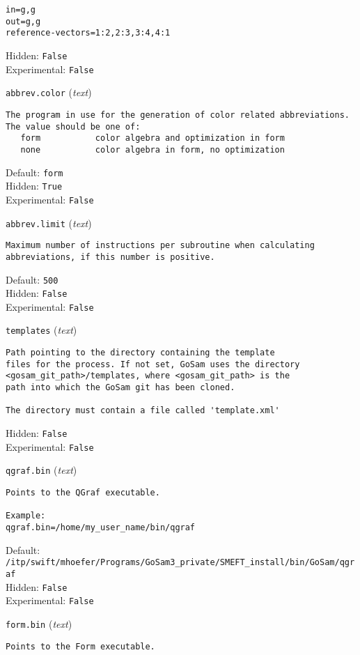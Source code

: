\begin{basedescript}{\desclabelstyle{\pushlabel}}
\begin{verbatim}
in=g,g
out=g,g
reference-vectors=1:2,2:3,3:4,4:1
\end{verbatim}
Hidden: \verb|False|
\\Experimental: \verb|False|
\\\item[\colorbox{gray!30}{\texttt{abbrev.color}}] (\textit{text})
\begin{verbatim}
The program in use for the generation of color related abbreviations.
The value should be one of:
   form           color algebra and optimization in form
   none           color algebra in form, no optimization
\end{verbatim}
Default: \verb|form|
\\Hidden: \verb|True|
\\Experimental: \verb|False|
\\\item[\colorbox{gray!30}{\texttt{abbrev.limit}}] (\textit{text})
\begin{verbatim}
Maximum number of instructions per subroutine when calculating
abbreviations, if this number is positive.
\end{verbatim}
Default: \verb|500|
\\Hidden: \verb|False|
\\Experimental: \verb|False|
\\\item[\colorbox{gray!30}{\texttt{templates}}] (\textit{text})
\begin{verbatim}
Path pointing to the directory containing the template
files for the process. If not set, GoSam uses the directory
<gosam_git_path>/templates, where <gosam_git_path> is the
path into which the GoSam git has been cloned.

The directory must contain a file called 'template.xml'
\end{verbatim}
Hidden: \verb|False|
\\Experimental: \verb|False|
\\\item[\colorbox{gray!30}{\texttt{qgraf.bin}}] (\textit{text})
\begin{verbatim}
Points to the QGraf executable.

Example:
qgraf.bin=/home/my_user_name/bin/qgraf
\end{verbatim}
Default: \verb|/itp/swift/mhoefer/Programs/GoSam3_private/SMEFT_install/bin/GoSam/qgraf|
\\Hidden: \verb|False|
\\Experimental: \verb|False|
\\\item[\colorbox{gray!30}{\texttt{form.bin}}] (\textit{text})
\begin{verbatim}
Points to the Form executable.


\end{verbatim}
\end{basedescript}
